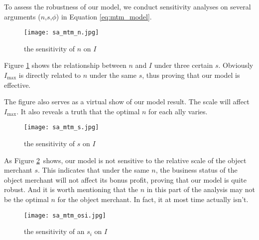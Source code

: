 To assess the robustness of our model, we conduct sensitivity analyses on several arguments ($n$,$s$,$\phi$) in Equation \ref{eq:mtm_model}.

\begin{enumerate}

\begin{figure}[H]
\centering
\texttt{[image: sa\_mtm\_n.jpg]}
\caption{the sensitivity of $n$ on $I$}
\label{fig:sa_mtm_n}
\end{figure}

Figure \ref{fig:sa_mtm_n} shows the relationship between $n$ and $I$ under three certain $s$. Obviously $I_{\max}$ is directly related to $n$ under the same $s$, thus proving that our model is effective.

The figure also serves as a virtual show of our model result. The scale will affect $I_{\max}$. It also reveals a truth that the optimal $n$ for each ally varies.


\begin{figure}[H]
\centering
\texttt{[image: sa\_mtm\_s.jpg]}
\caption{the sensitivity of $s$ on $I$}
\label{fig:sa_mtm_s}
\end{figure}

As Figure \ref{fig:sa_mtm_s}\ shows, our model is not sensitive to the relative scale of the object merchant $s$. This indicates that under the same $n$, the business status of the object merchant will not affect its bonus profit, proving that our model is quite robust. And it is worth mentioning that the $n$ in this part of the analysis may not be the optimal $n$ for the object merchant. In fact, it at most time actually isn't.




\begin{figure}[H]
\centering
\texttt{[image: sa\_mtm\_osi.jpg]}
\caption{the sensitivity of an $s_i$ on $I$}
\label{fig:sa_mtm_osi}
\end{figure}


\end{enumerate}
